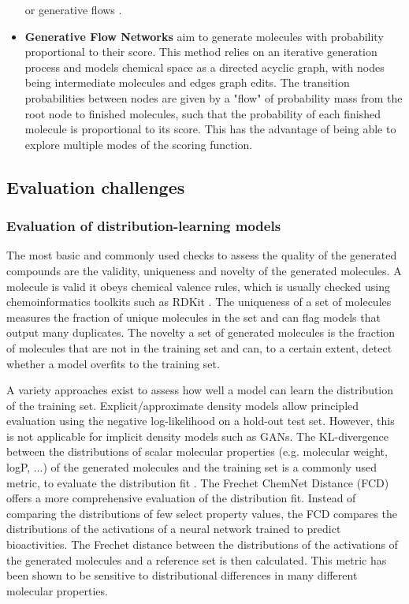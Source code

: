 \begin{itemize}
          or generative flows \citep{madhawaGraphNVPInvertibleFlow2019}.
    \item \textbf{Generative Flow Networks} \citep{bengioFlowNetworkBased2021} aim to generate
          molecules with probability proportional to their score. This method relies on an
          iterative generation process and models chemical space as a directed acyclic graph, with
          nodes being intermediate molecules and edges graph edits. The transition probabilities
          between nodes are given by a "flow" of probability mass from the root node to finished
          molecules, such that the probability of each finished molecule is proportional to its
          score. This has the advantage of being able to explore multiple modes of the scoring
          function.
\end{itemize}

\subsection{Evaluation challenges}
\subsubsection{Evaluation of distribution-learning models}
The most basic and commonly used checks to assess the quality of the generated compounds are the
validity, uniqueness and novelty of the generated molecules. A molecule is valid it obeys chemical
valence rules, which is usually checked using chemoinformatics toolkits such as RDKit
\citep{landrumRDKitOpensourceCheminformatics2006}. The uniqueness of a set of molecules measures the
fraction of unique molecules in the set and can flag models that output many duplicates. The novelty
a set of generated molecules is the fraction of molecules that are not in the training set and can,
to a certain extent, detect whether a model overfits to the training set.

A variety approaches exist to assess how well a model can learn the distribution of the training
set. Explicit/approximate density models allow principled evaluation using the negative
log-likelihood on a hold-out test set. However, this is not applicable for implicit density models
such as GANs. The KL-divergence between the distributions of scalar molecular properties (e.g.
molecular weight, logP, ...) of the generated molecules and the training set is a commonly used
metric, to evaluate the distribution fit \citep{brownGuacaMolBenchmarkingModels2019}. The Frechet
ChemNet Distance (FCD) \citep{preuerFrechetChemNetDistance2018} offers a more comprehensive evaluation
of the distribution fit. Instead of comparing the distributions of few select property values,
the FCD compares the distributions of the activations of a neural network trained to predict
bioactivities. The Frechet distance between the distributions of the activations of the generated
molecules and a reference set is then calculated. This metric has been shown to be sensitive to
distributional differences in many different molecular properties.

